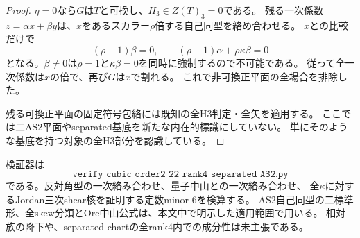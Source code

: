 \begin{proof}
$\eta=0$なら$G$は$T$と可換し、$H_3\in Z(T)_3=0$である。
残る一次係数$z=\alpha x+\beta y$は、$x$をあるスカラー$\rho$倍する自己同型を絡め合わせる。
$x$との比較だけで
\[
 (\rho-1)\beta=0,\qquad
 (\rho-1)\alpha+\rho\kappa\beta=0
\]
となる。$\beta\ne0$は$\rho=1$と$\kappa\beta=0$を同時に強制するので不可能である。
従って全一次係数は$x$の倍で、再び$G$は$x$で割れる。
これで非可換正平面の全場合を排除した。

残る可換正平面の固定符号包絡には既知の全H3判定・全矢を適用する。
ここでは二AS2平面やseparated基底を新たな内在的標識にしていない。
単にそのような基底を持つ対象の全H3部分を認識している。
\end{proof}

検証器は
\[
 \texttt{verify\_cubic\_order2\_22\_rank4\_separated\_AS2.py}
\]
である。反対角型の一次絡み合わせ、量子中山との一次絡み合わせ、
全$\kappa$に対するJordan三次shear核を証明する定数minor 6を検算する。
AS2自己同型の二標準形、全skew分類とOre中山公式は、本文中で明示した適用範囲で用いる。
相対族の降下や、separated chartの全rank4内での成分性は未主張である。
